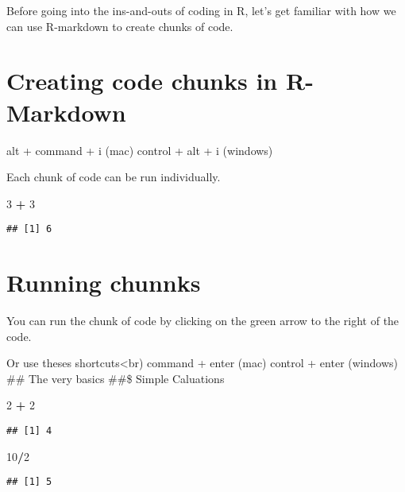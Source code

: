 \documentclass[
]{book}
\newenvironment{Shaded}{\begin{snugshade}}{\end{snugshade}}
\newcommand{\DecValTok}[1]{\textcolor[rgb]{0.00,0.00,0.81}{#1}}
\newcommand{\OperatorTok}[1]{\textcolor[rgb]{0.81,0.36,0.00}{\textbf{#1}}}
\newcommand{\StringTok}[1]{\textcolor[rgb]{0.31,0.60,0.02}{#1}}
\begin{document}
Before going into the ins-and-outs of coding in R, let's get familiar with
how we can use R-markdown to create chunks of code.

\hypertarget{creating-code-chunks-in-r-markdown}{%
\section{Creating code chunks in R-Markdown}\label{creating-code-chunks-in-r-markdown}}

alt + command + i (mac)
control + alt + i (windows)

Each chunk of code can be run individually.

\begin{Shaded}
\begin{Highlighting}[]
\DecValTok{3} \OperatorTok{+}\StringTok{ }\DecValTok{3}
\end{Highlighting}
\end{Shaded}

\begin{verbatim}
## [1] 6
\end{verbatim}

\hypertarget{running-chunnks}{%
\section{Running chunnks}\label{running-chunnks}}

You can run the chunk of code by clicking on the green arrow to the right
of the code.

Or use theses shortcuts\textless br)
command + enter (mac)
control + enter (windows)
\#\# The very basics
\#\#\$ Simple Caluations

\begin{Shaded}
\begin{Highlighting}[]
\DecValTok{2} \OperatorTok{+}\StringTok{ }\DecValTok{2}
\end{Highlighting}
\end{Shaded}

\begin{verbatim}
## [1] 4
\end{verbatim}

\begin{Shaded}
\begin{Highlighting}[]
\DecValTok{10}\OperatorTok{/}\DecValTok{2}
\end{Highlighting}
\end{Shaded}

\begin{verbatim}
## [1] 5
\end{verbatim}
\end{document}

